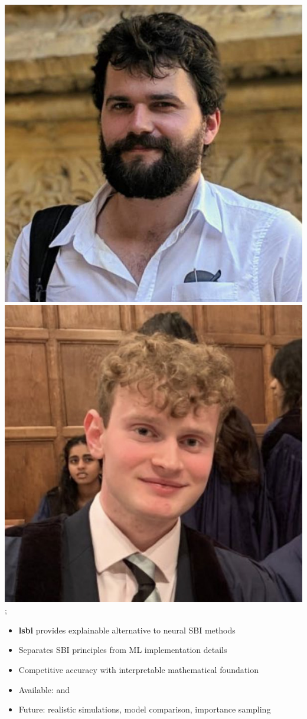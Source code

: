 \documentclass[aspectratio=169]{beamer}
\begin{document}
\begin{frame}
{        \includegraphics[width=0.09\textheight]{people/will_handley.jpg}%
        \includegraphics[width=0.09\textheight]{people/will_templeton.jpg}%
    };
    \begin{itemize}
        \item \textbf{lsbi} provides explainable alternative to neural SBI methods
        \item Separates SBI principles from ML implementation details  
        \item Competitive accuracy with interpretable mathematical foundation
        \item Available:  and 
        \item Future: realistic simulations, model comparison, importance sampling
    \end{itemize}
\end{frame}
\end{document}
